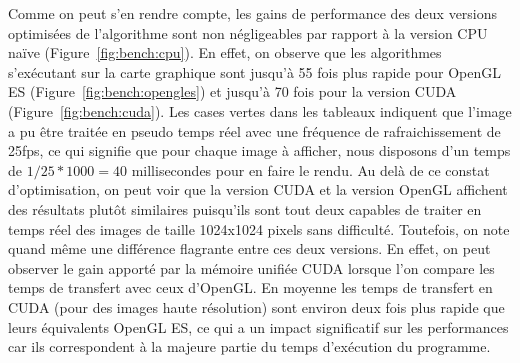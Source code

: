 \begin{table}[H]
\centering
\caption{CPU - Convolution d'une image en niveau de gris par un filtre de taille 5x5 - float 32bits}
\label{fig:bench:cpu}
\end{table}

Comme on peut s'en rendre compte, les gains de performance des deux versions optimisées de l'algorithme sont non négligeables par rapport à la version CPU naïve (Figure~\ref{fig:bench:cpu}). En effet, on observe que les algorithmes s'exécutant sur la carte graphique sont jusqu'à 55 fois plus rapide pour OpenGL ES (Figure~\ref{fig:bench:opengles}) et jusqu'à 70 fois pour la version CUDA (Figure~\ref{fig:bench:cuda}). Les cases vertes dans les tableaux indiquent que l'image a pu être traitée en pseudo temps réel avec une fréquence de rafraichissement de 25fps, ce qui signifie que pour chaque image à afficher, nous disposons d'un temps de $1/25 * 1000 = 40$ millisecondes pour en faire le rendu. Au delà de ce constat d'optimisation, on peut voir que la version CUDA et la version OpenGL affichent des résultats plutôt similaires puisqu'ils sont tout deux capables de traiter en temps réel des images de taille 1024x1024 pixels sans difficulté. Toutefois, on note quand même une différence flagrante entre ces deux versions. En effet, on peut observer le gain apporté par la mémoire unifiée CUDA lorsque l'on compare les temps de transfert avec ceux d'OpenGL. En moyenne les temps de transfert en CUDA (pour des images haute résolution) sont environ deux fois plus rapide que leurs équivalents OpenGL ES, ce qui a un impact significatif sur les performances car ils correspondent à la majeure partie du temps d'exécution du programme.

